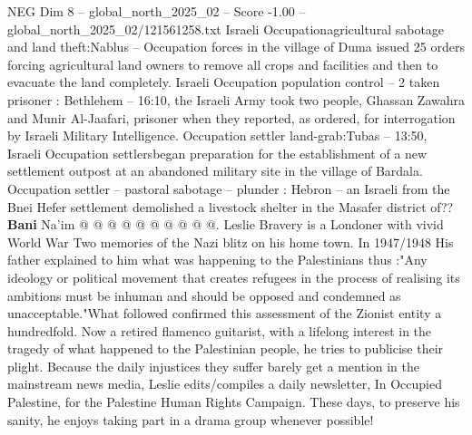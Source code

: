 \begin{textsample}{NEG Dim 8 – global\_north\_2025\_02 – Score -1.00 – global\_north\_2025\_02/121561258.txt}
Israeli Occupationagricultural sabotage and land theft:Nablus -- Occupation forces in the village of Duma issued 25 orders forcing agricultural land owners to remove all crops and facilities and then to evacuate the land completely.
Israeli Occupation population control -- 2 taken prisoner : Bethlehem -- 16:10, the Israeli Army took two people, Ghassan Zawahra and Munir Al-Jaafari, prisoner when they reported, as ordered, for interrogation by Israeli Military Intelligence.
Occupation settler land-grab:Tubas -- 13:50, Israeli Occupation settlersbegan preparation for the establishment of a new settlement outpost at an abandoned military site in the village of Bardala.
Occupation settler -- pastoral sabotage -- plunder : Hebron -- an Israeli from the Bnei Hefer settlement demolished a livestock shelter in the Masafer district of?? \textbf{Bani} Na'im @ @ @ @ @ @ @ @ @ @.
Leslie Bravery is a Londoner with vivid World War Two memories of the Nazi blitz on his home town.
In 1947/1948 His father explained to him what was happening to the Palestinians thus :"Any ideology or political movement that creates refugees in the process of realising its ambitions must be inhuman and should be opposed and condemned as unacceptable."What followed confirmed this assessment of the Zionist entity a hundredfold.
Now a retired flamenco guitarist, with a lifelong interest in the tragedy of what happened to the Palestinian people, he tries to publicise their plight.
Because the daily injustices they suffer barely get a mention in the mainstream news media, Leslie edits/compiles a daily newsletter, In Occupied Palestine, for the Palestine Human Rights Campaign.
These days, to preserve his sanity, he enjoys taking part in a drama group whenever possible!

\end{textsample}
